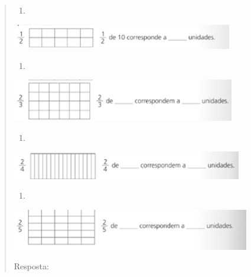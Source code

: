 \begin{enumerate}
\begin{escolha}
\begin{enumerate}
\begin{itemize}
\begin{itemize}
\begin{escolha}
\begin{quote}
\begin{escolha}
{%

\begin{enumerate}
\def\labelenumi{\alph{enumi})}
\item
\end{enumerate}

\includegraphics[width=3.79199in,height=0.43337in]{media/image114.png}

\begin{enumerate}
\def\labelenumi{\alph{enumi})}
\item
\end{enumerate}

\includegraphics[width=3.83367in,height=0.72506in]{media/image115.png}

\begin{enumerate}
\def\labelenumi{\alph{enumi})}
\item
\end{enumerate}

\includegraphics[width=3.95868in,height=0.48337in]{media/image116.png}

\begin{enumerate}
\def\labelenumi{\alph{enumi})}
\item
\end{enumerate}

\includegraphics[width=4.09202in,height=0.70839in]{media/image117.png}

Resposta:

}
\end{escolha}
\end{quote}
\end{escolha}
\end{itemize}
\end{itemize}
\end{enumerate}
\end{escolha}
\end{enumerate}
